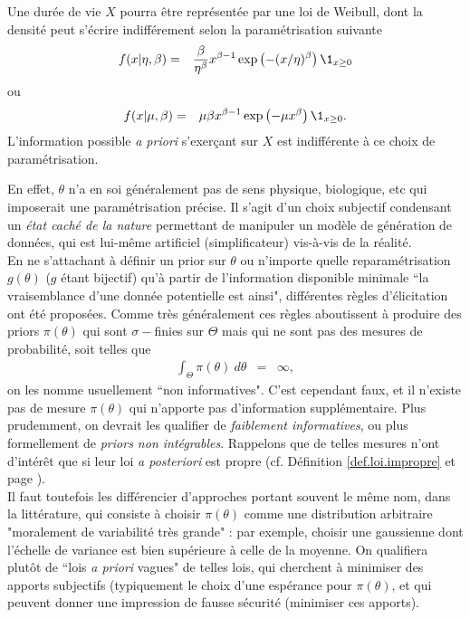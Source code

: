 \begin{exo}
Une durée de vie $X$ pourra être représentée par une loi de Weibull, dont la densité peut s'écrire indifférement selon la paramétrisation suivante 
\begin{eqnarray*}
f(x|\eta,\beta) & = & \frac{\beta}{\eta^{\beta}} x^{\beta-1} \exp\left(-(x/\eta)^{\beta}\right)\1_{x\geq 0}
\end{eqnarray*}
ou
\begin{eqnarray*}
f(x|\mu,\beta) & = & \mu\beta x^{\beta-1} \exp\left(-\mu x^{\beta}\right)\1_{x\geq 0}.
\end{eqnarray*}
L'information possible {\it a priori} s'exer\c cant sur $X$ est indifférente à ce choix de paramétrisation. \\
\end{exo}

En effet, $\theta$ n'a en soi généralement pas de sens physique, biologique, etc qui imposerait une paramétrisation précise. Il s'agit d'un choix subjectif condensant un \emph{état caché de la nature} permettant de manipuler un modèle de génération de données, qui est lui-même artificiel (simplificateur) vis-à-vis de la réalité. \\

En ne s'attachant à définir un prior sur $\theta$ ou n'importe quelle reparamétrisation $g(\theta)$ ($g$ étant bijectif) qu'à partir de l'information disponible minimale ``la vraisemblance d'une donnée potentielle est ainsi", différentes règles d'élicitation ont été proposées. Comme très généralement ces règles aboutissent à produire des priors $\pi(\theta)$ qui sont $\sigma-$finies sur $\Theta$ mais qui ne sont pas des mesures de probabilité, soit
telles que
\begin{eqnarray*}
\int_{\Theta} \pi(\theta) \ d \theta & = & \infty,
\end{eqnarray*}
on les nomme usuellement ``non informatives". C'est cependant faux, et il n'existe pas de mesure $\pi(\theta)$ qui n'apporte pas d'information supplémentaire. Plus prudemment, on devrait les qualifier de \emph{faiblement informatives}, ou plus formellement de {\it priors non intégrables}. Rappelons que de telles mesures n'ont d'intérêt que si leur loi {\it a posteriori} est propre (cf. Définition \ref{def.loi.impropre} et page \pageref{priors.impropres.choix}). \\

Il faut toutefois les différencier d'approches portant souvent le même nom, dans la littérature, qui consiste à choisir $\pi(\theta)$ comme une distribution arbitraire "moralement de variabilité très grande" : par exemple, choisir une gaussienne dont l'échelle de variance est bien supérieure à celle de la moyenne. On qualifiera plutôt de ``lois {\it a priori} vagues" de telles lois, qui cherchent à minimiser des apports subjectifs (typiquement le choix d'une espérance pour $\pi(\theta)$, et qui peuvent donner une impression de fausse sécurité (minimiser ces apports).  \\

